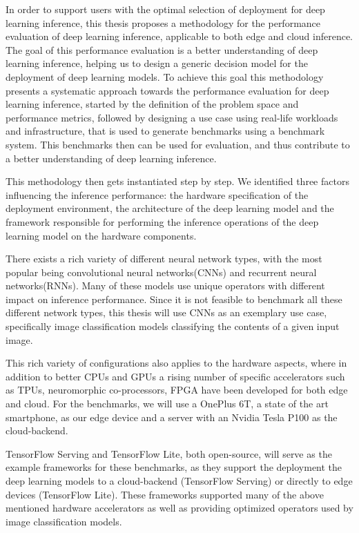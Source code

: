 In order to support users with the optimal selection of deployment for deep learning inference, this thesis proposes a methodology for the performance evaluation of deep learning inference, applicable to both edge and cloud inference.
The goal of this performance evaluation is a better understanding of deep learning inference, helping us to design a generic decision model for the deployment of deep learning models.
To achieve this goal this methodology presents a systematic approach towards the performance evaluation for deep learning inference, started by the definition of the problem space and performance metrics, followed by designing a use case using real-life workloads and infrastructure, that is used to generate benchmarks using a benchmark system.
This benchmarks then can be used for evaluation, and thus contribute to a better understanding of deep learning inference.

This methodology then gets instantiated step by step.
We identified three factors influencing the inference performance: the hardware specification of the deployment environment, the architecture of the deep learning model and the framework responsible for performing the inference operations of the deep learning model on the hardware components.

There exists a rich variety of different neural network types, with the most popular being convolutional neural networks(CNNs) and recurrent neural networks(RNNs).
Many of these models use unique operators with different impact on inference performance.
Since it is not feasible to benchmark all these different network types, this thesis will use CNNs as an exemplary use case, specifically image classification models classifying the contents of a given input image.

This rich variety of configurations also applies to the hardware aspects, where in addition to better CPUs and GPUs a rising number of specific accelerators such as TPUs, neuromorphic co-processors, FPGA have been developed for both edge and cloud.
For the benchmarks, we will use a OnePlus 6T, a state of the art smartphone, as our edge device and a server with an Nvidia Tesla P100 as the cloud-backend.

TensorFlow Serving and TensorFlow Lite, both open-source, will serve as the example frameworks for these benchmarks, as they support the deployment the deep learning models to a cloud-backend (TensorFlow Serving) or directly to edge devices (TensorFlow Lite). These frameworks supported many of the above mentioned hardware accelerators as well as providing optimized operators used by image classification models.

